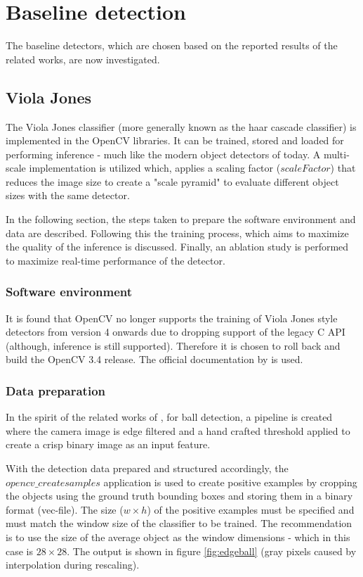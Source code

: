 \documentclass[a4paper,twoside,12pt]{report}
\begin{document}
\section{Baseline detection}

The baseline detectors, which are chosen based on the reported results of the related works, are now investigated.

\subsection{Viola Jones}

The Viola Jones classifier (more generally known as the haar cascade classifier) is implemented in the OpenCV libraries. It can be trained, stored and loaded for performing inference - much like the modern object detectors of today. A multi-scale implementation is utilized which, applies a scaling factor ($scaleFactor$) that reduces the image size to create a "scale pyramid" to evaluate different object sizes with the same detector. 

In the following section, the steps taken to prepare the software environment and data are described. Following this the training process, which aims to maximize the quality of the inference is discussed. Finally, an ablation study is performed to maximize real-time performance of the detector.

\subsubsection{Software environment}

It is found that OpenCV no longer supports the training of Viola Jones style detectors from version 4 onwards due to dropping support of the legacy C API (although, inference is still supported). Therefore it is chosen to roll back and build the OpenCV 3.4 release. The official documentation by \cite{vjdataset} is used.

\subsubsection{Data preparation}

In the spirit of the related works of \cite{robovj}, for ball detection, a pipeline is created where the camera image is edge filtered and a hand crafted threshold applied to create a crisp binary image as an input feature. 

With the detection data prepared and structured accordingly, the $opencv\_createsamples$ application is used to create positive examples by cropping the objects using the ground truth bounding boxes and storing them in a binary format (vec-file). The size ($w\times h$) of the positive examples must be specified and must match the window size of the classifier to be trained. The \cite{vjdataset} recommendation is to use the size of the average object as the window dimensions - which in this case is $28\times 28$. The output is shown in figure \ref{fig:edgeball} (gray pixels caused by interpolation during rescaling).
\end{document}
